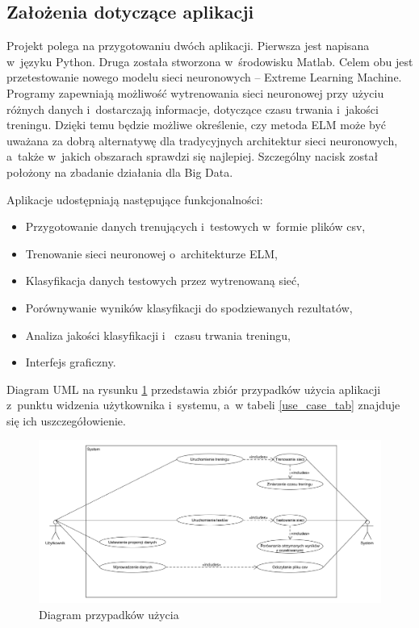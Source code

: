 \documentclass{article}
\begin{document}
\subsection{Założenia dotyczące aplikacji}
Projekt polega na przygotowaniu dwóch aplikacji. Pierwsza jest napisana w~języku Python. Druga została stworzona w~środowisku Matlab. Celem obu jest przetestowanie nowego modelu sieci neuronowych -- Extreme Learning Machine. Programy zapewniają możliwość wytrenowania sieci neuronowej przy użyciu różnych danych i~dostarczają informacje, dotyczące czasu trwania i~jakości treningu. Dzięki temu będzie możliwe określenie, czy metoda ELM może być uważana za dobrą alternatywę dla tradycyjnych architektur sieci neuronowych, a~także w~jakich obszarach sprawdzi się najlepiej. Szczególny nacisk został położony na zbadanie działania dla Big Data.

Aplikacje udostępniają następujące funkcjonalności:
\begin{itemize}
\item Przygotowanie danych trenujących i~testowych w~formie plików csv,
\item Trenowanie sieci neuronowej o~architekturze ELM,
\item Klasyfikacja danych testowych przez wytrenowaną sieć,
\item Porównywanie wyników klasyfikacji do spodziewanych rezultatów,
\item Analiza jakości klasyfikacji i~ czasu trwania treningu,
\item Interfejs graficzny.
\end{itemize}
Diagram UML na rysunku \ref{use_case} przedstawia zbiór przypadków użycia aplikacji z~punktu widzenia użytkownika i~systemu, a~w tabeli \ref{use_case_tab} znajduje się ich uszczegółowienie.
\begin{figure}[H]
\includegraphics[width=\textwidth]{use_case.png}
\caption{Diagram przypadków użycia}
\label{use_case}
\end{figure}
\end{document}
